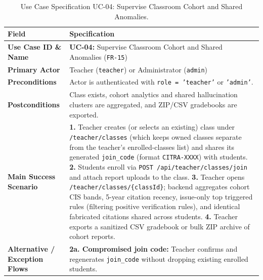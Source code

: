 \begin{table}[!htbp]
\centering
\caption{Use Case Specification UC-04: Supervise Classroom Cohort and Shared Anomalies.}\label{tab:uc04}
\begin{tabular}{|L{0.24}|L{0.76}|}
\hline
\textbf{Field} & \textbf{Specification} \\
\hline
\textbf{Use Case ID \& Name} & \textbf{UC-04:} Supervise Classroom Cohort and Shared Anomalies (\texttt{FR-15}) \\
\hline
\textbf{Primary Actor} & Teacher (\texttt{teacher}) or Administrator (\texttt{admin}) \\
\hline
\textbf{Preconditions} & Actor is authenticated with \texttt{role = 'teacher'} or \texttt{'admin'}. \\
\hline
\textbf{Postconditions} & Class exists, cohort analytics and shared hallucination clusters are aggregated, and ZIP/CSV gradebooks are exported. \\
\hline
\textbf{Main Success Scenario} & \textbf{1.} Teacher creates (or selects an existing) class under \texttt{/teacher/classes} (which keeps owned classes separate from the teacher's enrolled-classes list) and shares its generated \texttt{join\_code} (format \texttt{CITRA-XXXX}) with students. \newline \textbf{2.} Students enroll via \texttt{POST /api/teacher/classes/join} and attach report uploads to the class. \newline \textbf{3.} Teacher opens \texttt{/teacher/classes/\{classId\}}; backend aggregates cohort CIS bands, 5-year citation recency, issue-only top triggered rules (filtering positive verification rules), and identical fabricated citations shared across students. \newline \textbf{4.} Teacher exports a sanitized CSV gradebook or bulk ZIP archive of cohort reports. \\
\hline
\textbf{Alternative / Exception Flows} & \textbf{2a. Compromised join code:} Teacher confirms and regenerates \texttt{join\_code} without dropping existing enrolled students. \\
\hline
\end{tabular}
\end{table}

